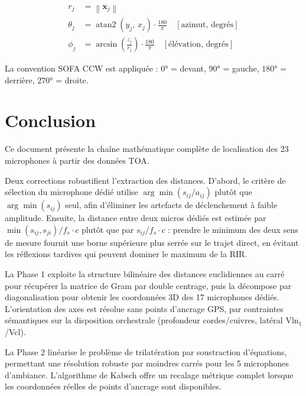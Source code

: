\documentclass[12pt, a4paper]{article}
\theoremstyle{plain}
\theoremstyle{definition}
\newcommand{\norm}[1]{\left\lVert #1 \right\rVert}
\newcommand{\vect}[1]{\mathbf{#1}}
\begin{document}
\begin{align}
    r_j &= \norm{\vect{x}_j} \\
    \theta_j &= \operatorname{atan2}(y_j,\, x_j)
        \cdot \frac{180}{\pi} \quad [\text{azimut, degrés}]\\
    \phi_j &= \arcsin\!\left(\frac{z_j}{r_j}\right)
        \cdot \frac{180}{\pi} \quad [\text{élévation, degrés}]
\end{align}

La convention SOFA CCW est appliquée : $0°$ = devant, $90°$ = gauche,
$180°$ = derrière, $270°$ = droite.

\section*{Conclusion}

Ce document présente la chaîne mathématique complète de localisation des 23
microphones à partir des données TOA.

Deux corrections robustifient l'extraction des distances.
D'abord, le critère de sélection du microphone dédié utilise
$\arg\min(s_{ij}/a_{ij})$ plutôt que $\arg\min(s_{ij})$ seul, afin d'éliminer
les artefacts de déclenchement à faible amplitude.  Ensuite, la distance entre
deux micros dédiés est estimée par $\min(s_{ij}, s_{ji})/f_s \cdot c$ plutôt
que par $s_{ij}/f_s \cdot c$ : prendre le minimum des deux sens de mesure
fournit une borne supérieure plus serrée sur le trajet direct, en évitant les
réflexions tardives qui peuvent dominer le maximum de la RIR.

La Phase 1 exploite la structure bilinéaire des distances euclidiennes au carré
pour récupérer la matrice de Gram par double centrage, puis la décompose par
diagonalisation pour obtenir les coordonnées 3D des 17 microphones dédiés.
L'orientation des axes est résolue sans points d'ancrage GPS, par contraintes
sémantiques sur la disposition orchestrale (profondeur cordes/cuivres, latéral
Vln$_1$/Vcl).

La Phase 2 linéarise le problème de trilatération par soustraction d'équations,
permettant une résolution robuste par moindres carrés pour les 5 microphones
d'ambiance.  L'algorithme de Kabsch offre un recalage métrique complet lorsque
les coordonnées réelles de points d'ancrage sont disponibles.
\end{document}
